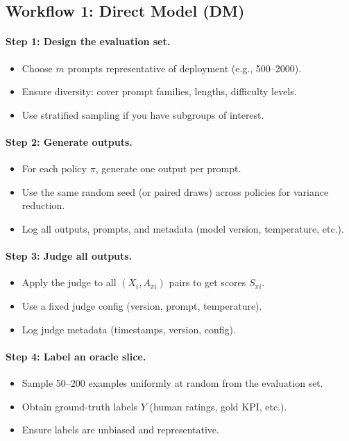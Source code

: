 \subsection{Workflow 1: Direct Model (DM)}

\paragraph{Step 1: Design the evaluation set.}
\begin{itemize}
\item Choose $m$ prompts representative of deployment (e.g., 500--2000).
\item Ensure diversity: cover prompt families, lengths, difficulty levels.
\item Use stratified sampling if you have subgroups of interest.
\end{itemize}

\paragraph{Step 2: Generate outputs.}
\begin{itemize}
\item For each policy $\pi$, generate one output per prompt.
\item Use the same random seed (or paired draws) across policies for variance reduction.
\item Log all outputs, prompts, and metadata (model version, temperature, etc.).
\end{itemize}

\paragraph{Step 3: Judge all outputs.}
\begin{itemize}
\item Apply the judge to all $(X_i, A_{\pi i})$ pairs to get scores $S_{\pi i}$.
\item Use a fixed judge config (version, prompt, temperature).
\item Log judge metadata (timestamps, version, config).
\end{itemize}

\paragraph{Step 4: Label an oracle slice.}
\begin{itemize}
\item Sample 50--200 examples uniformly at random from the evaluation set.
\item Obtain ground-truth labels $Y$ (human ratings, gold KPI, etc.).
\item Ensure labels are unbiased and representative.
\end{itemize}

